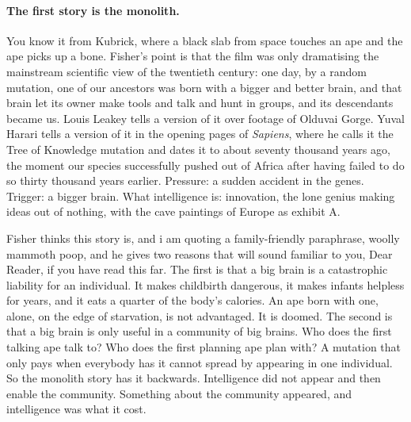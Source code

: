 \paragraph{The first story is the monolith.} You know it from Kubrick, where a black slab from space touches an ape and the ape picks up a bone. Fisher's point is that the film was only dramatising the mainstream scientific view of the twentieth century: one day, by a random mutation, one of our ancestors was born with a bigger and better brain, and that brain let its owner make tools and talk and hunt in groups, and its descendants became us. Louis Leakey tells a version of it over footage of Olduvai Gorge. Yuval Harari tells a version of it in the opening pages of \emph{Sapiens}, where he calls it the Tree of Knowledge mutation and dates it to about seventy thousand years ago, the moment our species successfully pushed out of Africa after having failed to do so thirty thousand years earlier. Pressure: a sudden accident in the genes. Trigger: a bigger brain. What intelligence is: innovation, the lone genius making ideas out of nothing, with the cave paintings of Europe as exhibit A.

Fisher thinks this story is, and i am quoting a family-friendly paraphrase, woolly mammoth poop, and he gives two reasons that will sound familiar to you, Dear Reader, if you have read this far. The first is that a big brain is a catastrophic liability for an individual. It makes childbirth dangerous, it makes infants helpless for years, and it eats a quarter of the body's calories. An ape born with one, alone, on the edge of starvation, is not advantaged. It is doomed. The second is that a big brain is only useful in a community of big brains. Who does the first talking ape talk to? Who does the first planning ape plan with? A mutation that only pays when everybody has it cannot spread by appearing in one individual. So the monolith story has it backwards. Intelligence did not appear and then enable the community. Something about the community appeared, and intelligence was what it cost.

